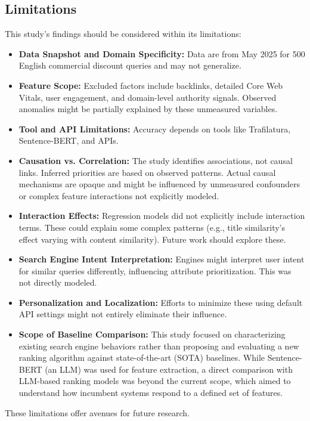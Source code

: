 \documentclass[a4paper,fleqn]{cas-sc}
\begin{document}
\subsection{Limitations}
\label{subsec:discussion_limitations}
This study's findings should be considered within its limitations:
\begin{itemize}
\item \textbf{Data Snapshot and Domain Specificity:} Data are from May 2025 for 500 English commercial discount queries and may not generalize.
\item \textbf{Feature Scope:} Excluded factors include backlinks, detailed Core Web Vitals, user engagement, and domain-level authority signals. Observed anomalies might be partially explained by these unmeasured variables.
\item \textbf{Tool and API Limitations:} Accuracy depends on tools like Trafilatura, Sentence-BERT, and APIs.
\item \textbf{Causation vs. Correlation:} The study identifies associations, not causal links. Inferred priorities are based on observed patterns. Actual causal mechanisms are opaque and might be influenced by unmeasured confounders or complex feature interactions not explicitly modeled.
\item \textbf{Interaction Effects:} Regression models did not explicitly include interaction terms. These could explain some complex patterns (e.g., title similarity's effect varying with content similarity). Future work should explore these.
\item \textbf{Search Engine Intent Interpretation:} Engines might interpret user intent for similar queries differently, influencing attribute prioritization. This was not directly modeled.
\item \textbf{Personalization and Localization:} Efforts to minimize these using default API settings might not entirely eliminate their influence.
\item \textbf{Scope of Baseline Comparison:} This study focused on characterizing existing search engine behaviors rather than proposing and evaluating a new ranking algorithm against state-of-the-art (SOTA) baselines. While Sentence-BERT (an LLM) was used for feature extraction, a direct comparison with LLM-based ranking models was beyond the current scope, which aimed to understand how incumbent systems respond to a defined set of features.
\end{itemize}
These limitations offer avenues for future research.
\end{document}
